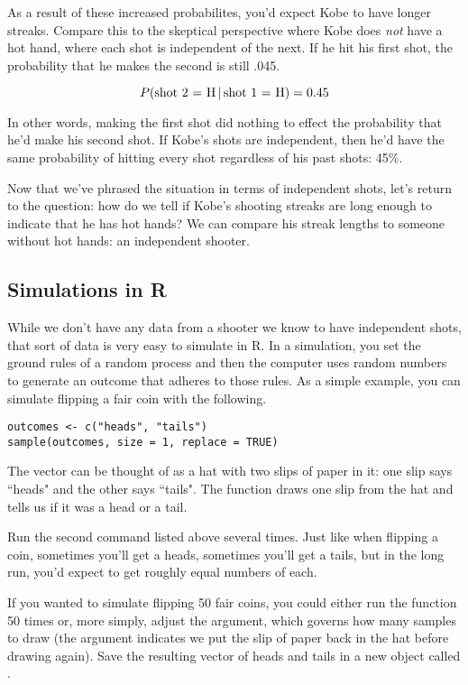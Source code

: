 \documentclass[11pt]{article}
\begin{document}
As a result of these increased probabilites, you'd expect Kobe to have longer streaks.  Compare this to the skeptical perspective where Kobe does \emph{not} have a hot hand, where each shot is independent of the next.  If he hit his first shot, the probability that he makes the second is still .045.

\[ P(\textnormal{shot 2 = H} \, | \, \textnormal{shot 1 = H}) = 0.45 \]

In other words, making the first shot did nothing to effect the probability that he'd make his second shot.  If Kobe's shots are independent, then he'd have the same probability of hitting every shot regardless of his past shots: 45\%.

Now that we've phrased the situation in terms of independent shots, let's return to the question: how do we tell if Kobe's shooting streaks are long enough to indicate that he has hot hands?  We can compare his streak lengths to someone without hot hands: an independent shooter.  


\subsection*{Simulations in R}
While we don't have any data from a shooter we know to have independent shots, that sort of data is very easy to simulate in R.  In a simulation, you set the ground rules of a random process and then the computer uses random numbers to generate an outcome that adheres to those rules.  As a simple example, you can simulate flipping a fair coin with the following.

\begin{lstlisting}
outcomes <- c("heads", "tails")
sample(outcomes, size = 1, replace = TRUE)
\end{lstlisting}

The vector  can be thought of as a hat with two slips of paper in it: one slip says ``heads" and the other says ``tails". The function  draws one slip from the hat and tells us if it was a head or a tail. 

Run the second command listed above several times. Just like when flipping a coin, sometimes you'll get a heads, sometimes you'll get a tails, but in the long run, you'd expect to get roughly equal numbers of each.

If you wanted to simulate flipping 50 fair coins, you could either run the function 50 times or, more simply, adjust the  argument, which governs how many samples to draw (the  argument indicates we put the slip of paper back in the hat before drawing again). Save the resulting vector of heads and tails in a new object called .
\end{document}
